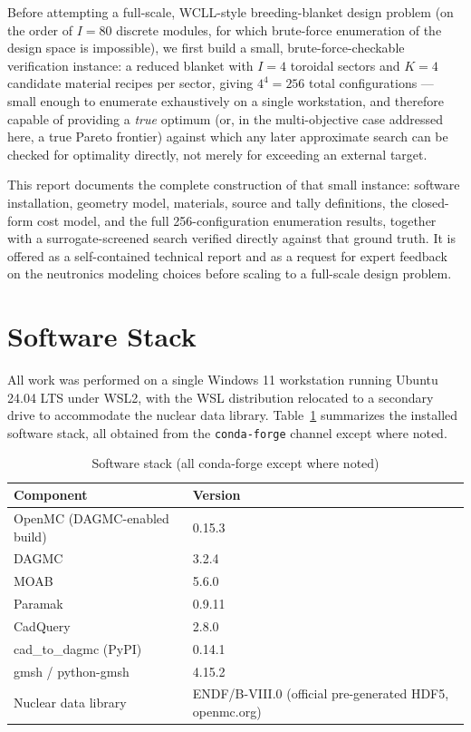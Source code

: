 \documentclass[11pt]{article}
\begin{document}
Before attempting a full-scale, WCLL-style breeding-blanket design problem
(on the order of $I=80$ discrete modules, for which brute-force enumeration
of the design space is impossible), we first build a small,
brute-force-checkable verification instance: a reduced blanket with $I=4$
toroidal sectors and $K=4$ candidate material recipes per sector, giving
$4^4=256$ total configurations --- small enough to enumerate exhaustively
on a single workstation, and therefore capable of providing a \emph{true}
optimum (or, in the multi-objective case addressed here, a true Pareto
frontier) against which any later approximate search can be checked for
optimality directly, not merely for exceeding an external target.

This report documents the complete construction of that small instance:
software installation, geometry model, materials, source and tally
definitions, the closed-form cost model, and the full 256-configuration
enumeration results, together with a surrogate-screened search verified
directly against that ground truth. It is offered as a self-contained
technical report and as a request for expert feedback on the neutronics
modeling choices before scaling to a full-scale design problem.

\section{Software Stack}

All work was performed on a single Windows 11 workstation running Ubuntu
24.04 LTS under WSL2, with the WSL distribution relocated to a secondary
drive to accommodate the nuclear data library. Table~\ref{t:stack}
summarizes the installed software stack, all obtained from the
\texttt{conda-forge} channel except where noted.

\begin{table}[h]
\centering
\caption{Software stack (all conda-forge except where noted)}\label{t:stack}
\begin{tabular}{ll}
\toprule
Component & Version \\
\midrule
OpenMC (DAGMC-enabled build) & 0.15.3 \\
DAGMC & 3.2.4 \\
MOAB & 5.6.0 \\
Paramak & 0.9.11 \\
CadQuery & 2.8.0 \\
cad\_to\_dagmc (PyPI) & 0.14.1 \\
gmsh / python-gmsh & 4.15.2 \\
Nuclear data library & ENDF/B-VIII.0 (official pre-generated HDF5, openmc.org) \\
\bottomrule
\end{tabular}
\end{table}
\end{document}
